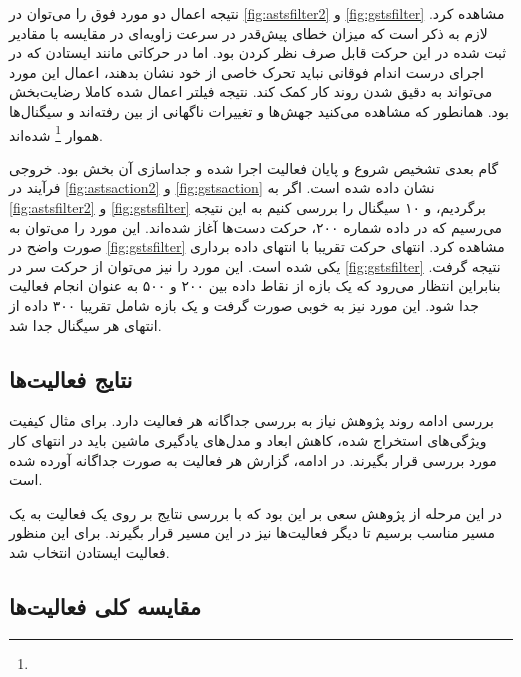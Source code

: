  نتیجه اعمال دو مورد فوق را می‌توان در 
\autoref{fig:astsfilter2}
و
\autoref{fig:gstsfilter}
مشاهده کرد. لازم به ذکر است که میزان خطای پیش‌قدر در سرعت زاویه‌ای در مقایسه با مقادیر ثبت شده در این حرکت قابل صرف نظر کردن بود. اما در حرکاتی مانند ایستادن که در اجرای درست اندام فوقانی نباید تحرک خاصی از خود نشان بدهند، اعمال این مورد  می‌تواند به دقیق شدن روند کار کمک کند. نتیجه فیلتر اعمال شده کاملا رضایت‌بخش بود. همانطور که مشاهده می‌کنید جهش‌ها و تغییرات ناگهانی از بین رفته‌اند و سیگنال‌ها هموار
\footnote{}
شده‌اند.

گام بعدی تشخیص شروع و پایان فعالیت اجرا شده و جداسازی آن بخش بود. خروجی فرآیند در 
\autoref{fig:astsaction2}
و
\autoref{fig:gstsaction}
نشان داده شده است. اگر به 
\autoref{fig:astsfilter2}
و
\autoref{fig:gstsfilter}
برگردیم، و ۱۰ سیگنال را بررسی کنیم به این نتیجه می‌رسیم که در داده شماره ۲۰۰، حرکت دست‌ها آغاز شده‌اند. این مورد را می‌توان به صورت واضح در 
\autoref{fig:gstsfilter}
مشاهده کرد. انتهای حرکت تقریبا با انتهای داده برداری یکی شده است. این مورد را نیز می‌توان از حرکت سر در 
\autoref{fig:gstsfilter}
نتیجه گرفت. بنابراین انتظار می‌رود که یک بازه از نقاط داده بین  ۲۰۰ و ۵۰۰ به عنوان انجام فعالیت جدا شود. این مورد نیز به خوبی صورت گرفت و یک بازه شامل تقریبا ۳۰۰ داده از انتهای هر سیگنال جدا شد.



\subsection{نتایج فعالیت‌ها}

بررسی ادامه روند پژوهش نیاز به بررسی جداگانه هر فعالیت دارد. برای مثال کیفیت ویژگی‌های استخراج شده، کاهش ابعاد و مدل‌های یادگیری ماشین باید در انتهای کار مورد بررسی قرار بگیرند. در ادامه، گزارش هر فعالیت به صورت جداگانه آورده شده است. 

در این مرحله از پژوهش سعی بر این بود که با بررسی نتایج بر روی یک فعالیت به یک مسیر مناسب برسیم تا دیگر فعالیت‌ها نیز در این مسیر قرار بگیرند. برای این منظور فعالیت ایستادن انتخاب شد.











\subsection{مقایسه کلی فعالیت‌ها}

